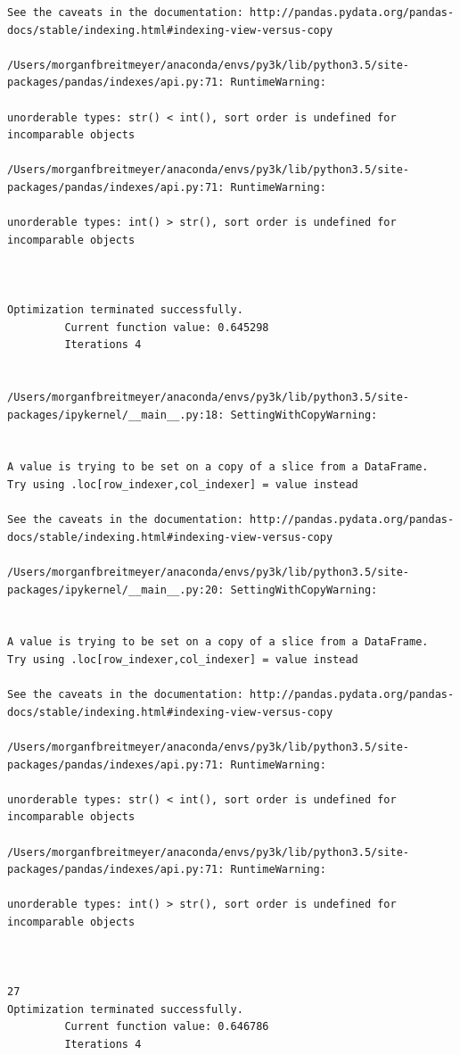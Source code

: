 \begin{lstlisting}
See the caveats in the documentation: http://pandas.pydata.org/pandas-docs/stable/indexing.html#indexing-view-versus-copy

/Users/morganfbreitmeyer/anaconda/envs/py3k/lib/python3.5/site-packages/pandas/indexes/api.py:71: RuntimeWarning:

unorderable types: str() < int(), sort order is undefined for incomparable objects

/Users/morganfbreitmeyer/anaconda/envs/py3k/lib/python3.5/site-packages/pandas/indexes/api.py:71: RuntimeWarning:

unorderable types: int() > str(), sort order is undefined for incomparable objects



Optimization terminated successfully.
         Current function value: 0.645298
         Iterations 4


/Users/morganfbreitmeyer/anaconda/envs/py3k/lib/python3.5/site-packages/ipykernel/__main__.py:18: SettingWithCopyWarning:


A value is trying to be set on a copy of a slice from a DataFrame.
Try using .loc[row_indexer,col_indexer] = value instead

See the caveats in the documentation: http://pandas.pydata.org/pandas-docs/stable/indexing.html#indexing-view-versus-copy

/Users/morganfbreitmeyer/anaconda/envs/py3k/lib/python3.5/site-packages/ipykernel/__main__.py:20: SettingWithCopyWarning:


A value is trying to be set on a copy of a slice from a DataFrame.
Try using .loc[row_indexer,col_indexer] = value instead

See the caveats in the documentation: http://pandas.pydata.org/pandas-docs/stable/indexing.html#indexing-view-versus-copy

/Users/morganfbreitmeyer/anaconda/envs/py3k/lib/python3.5/site-packages/pandas/indexes/api.py:71: RuntimeWarning:

unorderable types: str() < int(), sort order is undefined for incomparable objects

/Users/morganfbreitmeyer/anaconda/envs/py3k/lib/python3.5/site-packages/pandas/indexes/api.py:71: RuntimeWarning:

unorderable types: int() > str(), sort order is undefined for incomparable objects



27
Optimization terminated successfully.
         Current function value: 0.646786
         Iterations 4



\end{lstlisting}
